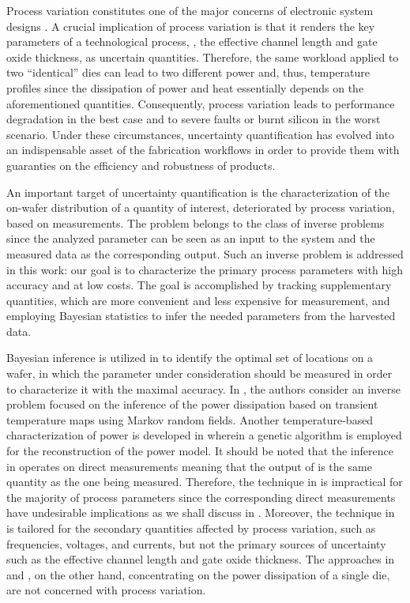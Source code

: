 Process variation constitutes one of the major concerns of electronic system designs \cite{chandrakasan2001, srivastava2010}. A crucial implication of process variation is that it renders the key parameters of a technological process, \eg, the effective channel length and gate oxide thickness, as uncertain quantities.
Therefore, the same workload applied to two ``identical'' dies can lead to two different power and, thus, temperature profiles since the dissipation of power and heat essentially depends on the aforementioned quantities.
Consequently, process variation leads to performance degradation in the best case and to severe faults or burnt silicon in the worst scenario.
Under these circumstances, uncertainty quantification has evolved into an indispensable asset of the fabrication workflows in order to provide them with guaranties on the efficiency and robustness of products.

An important target of uncertainty quantification is the characterization of the on-wafer distribution of a quantity of interest, deteriorated by process variation, based on measurements.
The problem belongs to the class of inverse problems since the analyzed parameter can be seen as an input to the system and the measured data as the corresponding output.
Such an inverse problem is addressed in this work: our goal is to characterize the primary process parameters with high accuracy and at low costs.
The goal is accomplished by tracking supplementary quantities, which are more convenient and less expensive for measurement, and employing Bayesian statistics \cite{gelman2004} to infer the needed parameters from the harvested data.

Bayesian inference is utilized in \cite{zhang2010} to identify the optimal set of locations on a wafer, in which the parameter under consideration should be measured in order to characterize it with the maximal accuracy.
In \cite{paek2012}, the authors consider an inverse problem focused on the inference of the power dissipation based on transient temperature maps using Markov random fields.
Another temperature-based characterization of power is developed in \cite{mesa-martinez2007} wherein a genetic algorithm is employed for the reconstruction of the power model.
It should be noted that the inference in \cite{zhang2010} operates on direct measurements meaning that the output of \cite{zhang2010} is the same quantity as the one being measured.
Therefore, the technique in \cite{zhang2010} is impractical for the majority of process parameters since the corresponding direct measurements have undesirable implications as we shall discuss in .
Moreover, the technique in \cite{zhang2010} is tailored for the secondary quantities affected by process variation, such as frequencies, voltages, and currents, but not the primary sources of uncertainty such as the effective channel length and gate oxide thickness.
The approaches in \cite{paek2012} and \cite{mesa-martinez2007}, on the other hand, concentrating on the power dissipation of a single die, are not concerned with process variation.

